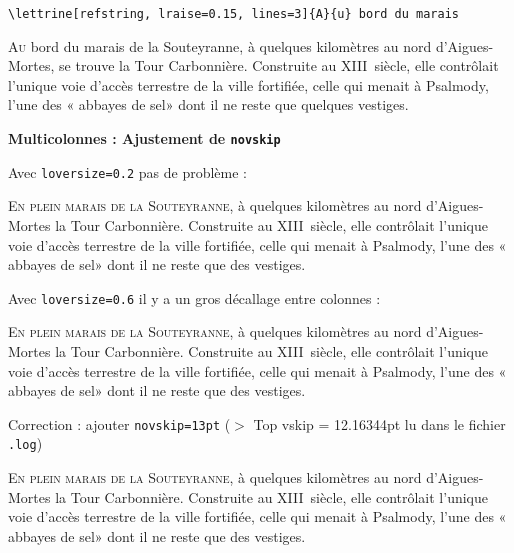 \documentclass[paper=a4,12pt,german,french]{scrartcl}
\begin{document}
\verb+\lettrine[refstring, lraise=0.15, lines=3]{A}{u} bord du marais+

\lettrine[refstring, lraise=0.15, lines=3]{A}{u} bord du marais de la
Souteyranne, à quelques kilomètres au nord d'Aigues-Mortes, se trouve
la Tour Carbonnière.
Construite au XIII\ieme~siècle, elle contrôlait l'unique voie d'accès
terrestre de la ville fortifiée, celle qui menait à Psalmody,
l'une des « abbayes de sel» dont il ne reste que quelques vestiges.

\newpage
\begin{center}
\large\bfseries Multicolonnes : Ajustement de \texttt{novskip}
\end{center}

\renewcommand{\LettrineFontHook}{}

Avec \texttt{loversize=0.2} pas de problème :

\vspace{\baselineskip}
\begin{multicols}{2}\RaggedRight
  \lettrine[loversize=0.2]{E}{n plein marais de la Souteyranne},
à quelques kilomètres au nord d'Aigues-Mortes la Tour Carbonnière.
Construite au XIII\ieme~siècle, elle contrôlait l'unique voie d'accès
terrestre de la ville fortifiée, celle qui menait à Psalmody,
l'une des « abbayes de sel» dont il ne reste que des vestiges.
\end{multicols}

Avec \texttt{loversize=0.6} il y a un gros décallage entre colonnes :

\vspace{\baselineskip}
\begin{multicols}{2}\RaggedRight
  \lettrine[loversize=0.6]{E}{n plein marais de la Souteyranne},
à quelques kilomètres au nord d'Aigues-Mortes la Tour Carbonnière.
Construite au XIII\ieme~siècle, elle contrôlait l'unique voie d'accès
terrestre de la ville fortifiée, celle qui menait à Psalmody,
l'une des « abbayes de sel» dont il ne reste que des vestiges.
\end{multicols}

Correction : ajouter \texttt{novskip=13pt} ($>$ Top vskip = 12.16344pt lu
dans le fichier \texttt{.log})

\begin{multicols}{2}\RaggedRight
  \lettrine[loversize=0.6,novskip=13pt]{E}{n plein marais de la Souteyranne},
à quelques kilomètres au nord d'Aigues-Mortes la Tour Carbonnière.
Construite au XIII\ieme~siècle, elle contrôlait l'unique voie d'accès
terrestre de la ville fortifiée, celle qui menait à Psalmody,
l'une des « abbayes de sel» dont il ne reste que des vestiges.
\end{multicols}
\end{document}
